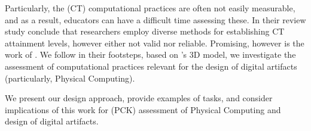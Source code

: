 Particularly, the (CT) computational practices are often not easily measurable, and as a result, educators can have a difficult time assessing these. In their review study  conclude that researchers employ diverse methods for establishing CT attainment levels, however either not valid nor reliable. Promising, however is the work of \cite{LyeKoh2014}. We follow in their footsteps, based on \citeauthor{BrennanResnick2012}'s 3D model, we investigate the assessment of computational practices relevant for the design of digital artifacts (particularly, Physical Computing).


We present our design approach, provide examples of tasks, and consider implications of this work for (PCK) assessment of Physical Computing and design of digital artifacts.







%










